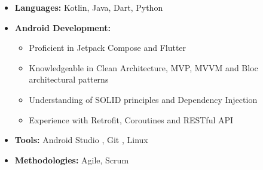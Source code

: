 \documentclass[a4paper,10pt]{article} %
\begin{document}
\begin{itemize}
    \item \textbf{Languages: }Kotlin, Java, Dart, Python
    \item \textbf{Android Development:} 
        \begin{itemize}
            \item Proficient in Jetpack Compose and Flutter
            \item Knowledgeable in Clean Architecture, MVP, MVVM and Bloc architectural patterns
            \item Understanding of SOLID principles and Dependency Injection
            \item Experience with Retrofit, Coroutines and RESTful API 
        \end{itemize}
    \item \textbf{Tools: }Android Studio , Git , Linux
    \item \textbf{Methodologies: }Agile, Scrum
\end{itemize}
\end{document}
